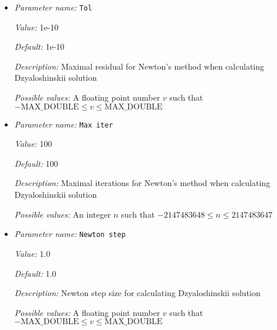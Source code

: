 \begin{itemize}
{\it Value:} 10


{\it Default:} 10


{\it Description:} Number of line refines for Dzyaloshinskii numerical solution


{\it Possible values:} An integer $n$ such that $-2147483648\leq n \leq 2147483647$
\item {\it Parameter name:} {\tt Tol}
\label{parameters:Nematic system MPI/Boundary values/Dzyaloshinskii/Tol}
\label{parameters:Nematic_20system_20MPI/Boundary_20values/Dzyaloshinskii/Tol}


{\it Value:} 1e-10


{\it Default:} 1e-10


{\it Description:} Maximal residual for Newton's method when calculating Dzyaloshinskii solution


{\it Possible values:} A floating point number $v$ such that $-\text{MAX\_DOUBLE} \leq v \leq \text{MAX\_DOUBLE}$
\item {\it Parameter name:} {\tt Max iter}
\label{parameters:Nematic system MPI/Boundary values/Dzyaloshinskii/Max iter}
\label{parameters:Nematic_20system_20MPI/Boundary_20values/Dzyaloshinskii/Max_20iter}


{\it Value:} 100


{\it Default:} 100


{\it Description:} Maximal iterations for Newton's method when calculating Dzyaloshinskii solution


{\it Possible values:} An integer $n$ such that $-2147483648\leq n \leq 2147483647$
\item {\it Parameter name:} {\tt Newton step}
\label{parameters:Nematic system MPI/Boundary values/Dzyaloshinskii/Newton step}
\label{parameters:Nematic_20system_20MPI/Boundary_20values/Dzyaloshinskii/Newton_20step}


{\it Value:} 1.0


{\it Default:} 1.0


{\it Description:} Newton step size for calculating Dzyaloshinskii solution


{\it Possible values:} A floating point number $v$ such that $-\text{MAX\_DOUBLE} \leq v \leq \text{MAX\_DOUBLE}$
\end{itemize}

